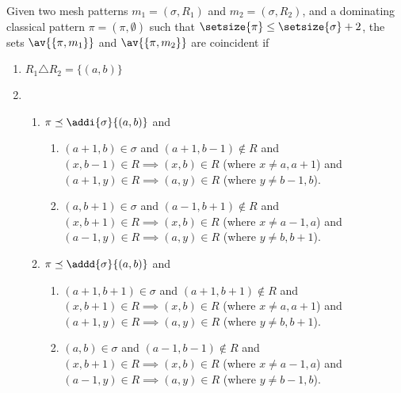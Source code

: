\begin{proposition}
    \label{prop:dom2}
    Given two mesh patterns \(m_1 =(\sigma, R_1)\) and \(m_2 = (\sigma, R_2)\),
    and a dominating classical pattern \(\pi = (\pi,\emptyset)\) such that
    \(\setsize{\pi} \le \setsize{\sigma} + 2\), the sets \(\av{\{\pi,m_1\}}\) and
    \(\av{\{\pi,m_2\}}\) are coincident if

    \begin{enumerate}
        \item \(R_1 \triangle R_2 = \{(a,b)\}\)
        \item   \begin{enumerate}
                \item\label{prop:dom2:condc} \(\pi \preceq \addi{\sigma}{(a,b)}\) and
                        \begin{enumerate}
                            \item \((a+1,b) \in \sigma\) and \((a+1,b-1)\notin R\) and \\
                                \((x,b-1)\in R \implies (x,b) \in R \) (where \(x\neq a,a+1\)) and\\
                                  \((a+1,y)\in R \implies (a,y) \in R\) (where \(y\neq b-1,b\)).
                            \item \((a,b+1) \in \sigma\) and \((a-1,b+1)\notin R\) and \\
                                  \((x,b+1)\in R \implies (x,b) \in R\) (where \(x\neq a-1,a\)) and\\
                                  \((a-1,y)\in R \implies (a,y) \in R\) (where \(y\neq b,b+1\)).
                        \end{enumerate}
                    \item \(\pi \preceq \addd{\sigma}{(a,b)}\) and
                        \begin{enumerate}
                            \item \((a+1,b+1) \in \sigma\) and \((a+1,b+1)\notin R\) and \\
                                  \((x,b+1)\in R \implies (x,b) \in R\) (where \(x\neq a,a+1\)) and\\
                                  \((a+1,y)\in R \implies (a,y) \in R\) (where \(y\neq b,b+1\)).
                            \item \((a,b) \in \sigma\) and \((a-1,b-1)\notin R\) and \\
                                  \((x,b+1)\in R \implies (x,b) \in R\) (where \(x\neq a-1,a\)) and\\
                                  \((a-1,y)\in R \implies (a,y) \in R\)  (where \(y\neq b-1,b\)).
                        \end{enumerate}
                \end{enumerate}
    \end{enumerate}
\end{proposition}
